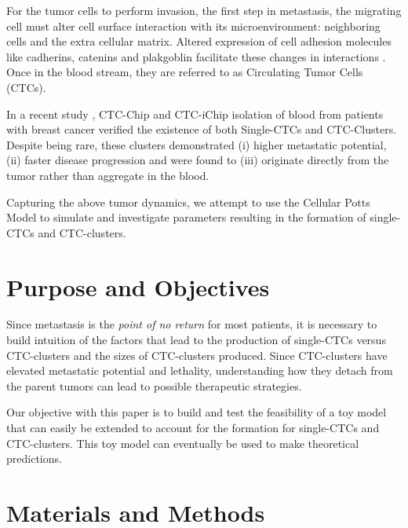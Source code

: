 \documentclass[12pt]{article}
\begin{document}
For the tumor cells to perform invasion, the first step in metastasis, the migrating cell must alter cell surface interaction with its microenvironment: neighboring cells and the extra cellular matrix. Altered expression of cell adhesion molecules like cadherins, catenins and plakgoblin facilitate these changes in interactions \cite{Aktary2012}. Once in the blood stream, they are referred to as Circulating Tumor Cells (CTCs).

In a recent study \cite{Aceto2014}, CTC-Chip and CTC-iChip isolation of blood from patients with breast cancer verified the existence of both Single-CTCs and CTC-Clusters. Despite being rare, these clusters demonstrated (i) higher metastatic potential, (ii) faster disease progression and were found to (iii) originate directly from the tumor rather than aggregate in the blood.

Capturing the above tumor dynamics, we attempt to use the Cellular Potts Model to simulate and investigate parameters resulting in the formation of single-CTCs and CTC-clusters.

\section{Purpose and Objectives}
Since metastasis is the \emph{point of no return} for most patients, it is necessary to build intuition of the factors that lead to the production of single-CTCs versus CTC-clusters and the sizes of CTC-clusters produced. Since CTC-clusters have elevated metastatic potential and lethality, understanding how they detach from the parent tumors can lead to possible therapeutic strategies.

Our objective with this paper is to build and test the feasibility of a toy model that can easily be extended to account for the formation for single-CTCs and CTC-clusters. This toy model can eventually be used to make theoretical predictions.

\section{Materials and Methods}
\end{document}
